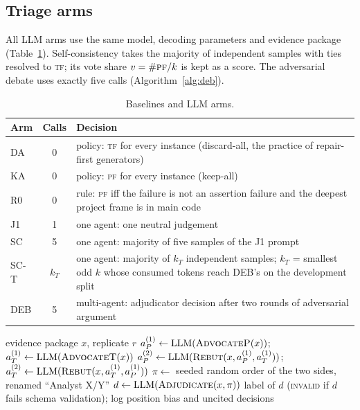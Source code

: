 \documentclass[pdflatex,iicol,sn-mathphys-num]{sn-jnl}
\newcommand{\PF}{\textsc{pf}}
\newcommand{\TF}{\textsc{tf}}
\begin{document}
\subsection{Triage arms}
All LLM arms use the same model, decoding parameters and evidence package (Table~\ref{tab:arms}). Self-consistency takes the majority of independent samples with ties resolved to \TF; its vote share $v=\#\PF/k$ is kept as a score. The adversarial debate uses exactly five calls (Algorithm~\ref{alg:deb}).

\begin{table}[t]
\caption{Baselines and LLM arms.}\label{tab:arms}
\footnotesize
\begin{tabularx}{\columnwidth}{@{}l c X@{}}
\toprule
Arm & Calls & Decision \\
\midrule
DA & 0 & policy: \TF{} for every instance (discard-all, the practice of repair-first generators) \\
KA & 0 & policy: \PF{} for every instance (keep-all) \\
R0 & 0 & rule: \PF{} iff the failure is not an assertion failure and the deepest project frame is in main code \\
J1 & 1 & one agent: one neutral judgement \\
SC & 5 & one agent: majority of five samples of the J1 prompt \\
SC-T & $k_T$ & one agent: majority of $k_T$ independent samples; $k_T$ = smallest odd $k$ whose consumed tokens reach DEB's on the development split \\
DEB & 5 & multi-agent: adjudicator decision after two rounds of adversarial argument \\
\bottomrule
\end{tabularx}
\end{table}

\begin{algorithm}[t]
\caption{Adversarial debate (DEB) for one instance}\label{alg:deb}
\begin{algorithmic}[1]
\Require evidence package $x$, replicate $r$
\State $a_P^{(1)} \gets \mathrm{LLM}(\textsc{AdvocateP}(x))$; \quad $a_T^{(1)} \gets \mathrm{LLM}(\textsc{AdvocateT}(x))$ 
\State $a_P^{(2)} \gets \mathrm{LLM}(\textsc{Rebut}(x, a_P^{(1)}, a_T^{(1)}))$; \quad $a_T^{(2)} \gets \mathrm{LLM}(\textsc{Rebut}(x, a_T^{(1)}, a_P^{(1)}))$
\State $\pi \gets$ seeded random order of the two sides, renamed ``Analyst X/Y''
\State $d \gets \mathrm{LLM}(\textsc{Adjudicate}(x, \pi))$ 
\State \Return label of $d$ (\textsc{invalid} if $d$ fails schema validation); log position bias and uncited decisions
\end{algorithmic}
\end{algorithm}
\end{document}
